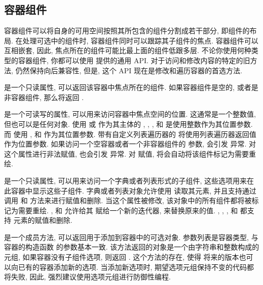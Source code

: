 \subsection{容器组件}
容器组件可以将自身的可用空间按照其所包含的组件分割成若干部分, 即组件的布局. 在处理可选中的组件时, 容器组件同时可以跟踪其子组件的焦点. 容器组件可以互相嵌套, 因此, 焦点所在的组件可能比最上面的组件低跟多层. 不论你使用何种类型的容器组件, 你都可以使用 \urwid{} 提供的通用 API. 对于访问和修改内容的特定的旧方法, 仍然保持向后兼容性, 但是, 这个 API 现在是修改和遍历容器的首选方法.

\indent{} 是一个只读属性, 可以返回该容器中焦点所在的组件. 如果容器组件是空的, 或者是非容器组件, 那么将返回 .

\indent{} 是一个可读写的属性, 可以用来访问容器中焦点空间的位置. 这通常是一个整数值, 但也可以是任何对象. 使用 或  作为其主体的 , , ,  和  是使用整数作为其位置参数. 而  使用 ,  和  作为其位置参数. 带有自定义列表遍历器的  将使用列表遍历器返回值作为位置参数. 如果访问一个空容器或者一个非容器组件的  参数, 会引发  异常. 对这个属性进行非法赋值, 也会引发  异常. 对  赋值, 将会自动将该组件标记为需要重绘.

\indent{} 是一个只读属性, 可以用来访问一个字典或者列表形式的子组件, 这些选项用来在此容器中显示这些子组件. 字典或者列表对象允许使用  读取其元素, 并且支持通过调用  和  方法来进行赋值和删除. 当这个属性被修改, 该对象中的所有组件都将被标记为需要重绘. ,  和  允许给其  赋给一个新的迭代器, 来替换原来的值. , , ,  和  都支持  元素的赋值和删除.

\indent{} 是一个成员方法, 可以返回用于添加到容器中的可选对象. 参数列表是容器类型, 与容器的构造函数  的参数基本一致. 该方法返回的对象是一个由字符串和整数构成的元组, 如果容器没有子组件选项, 则返回 . 这个方法的存在, 使得 \urwid{} 将来的版本也可以向已有的容器添加新的选项. 当添加新选项时, 期望选项元组保持不变的代码都将失败, 因此, 强烈建议使用选项元组进行防御性编程.

